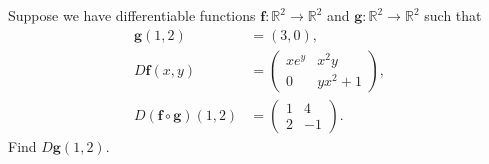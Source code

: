\begin{problem}
Suppose we have differentiable functions $\mathbf{f}:\mathbb{R}^2\rightarrow\mathbb{R}^2$ and $\mathbf{g}:\mathbb{R}^2\rightarrow\mathbb{R}^2$ such that
\begin{align*}
\mathbf{g}(1,2) &= (3,0),\\
D\mathbf{f}(x,y) &= \left(\begin{array}{cc} xe^y & x^2y \\ 0 & yx^2+1\end{array}\right),\\
D(\mathbf{f}\circ\mathbf{g})(1,2) &= \left(\begin{array}{cc} 1 & 4 \\ 2 & -1\end{array}\right).
\end{align*}
Find $D\mathbf{g}(1,2)$.
\end{problem}